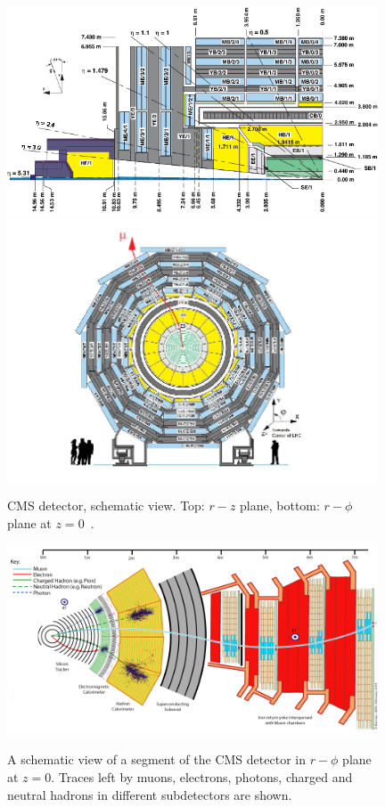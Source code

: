 \begin{figure}[htb]
  \begin{center}
    {\includegraphics[width=0.98\textwidth]{../figs/Exp/CMSview1.png}\\
     \includegraphics[width=0.98\textwidth]{../figs/Exp/CMSview.png}}
    \caption{CMS detector, schematic view. Top: $r-z$ plane, bottom: $r-\phi$ plane at $z=0$~\cite{ref_CMSschemView}. }
    \label{fig:CMSschemView}
  \end{center}
\end{figure}


\begin{figure}[htb]
  \begin{center}
    {\includegraphics[width=0.98\textwidth]{../figs/Exp/CMS_Slice.png}}
    \caption{A schematic view of a segment of the CMS detector in $r-\phi$ plane at $z=0$. Traces left by muons, electrons, photons, charged and neutral hadrons in different subdetectors are shown.}
    \label{fig:CMS_slice}
  \end{center}
\end{figure}

